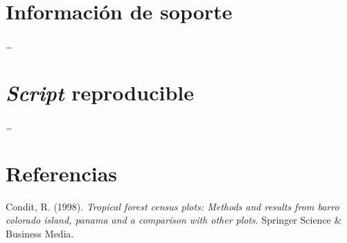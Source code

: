 \documentclass[11pt,]{article}
\begin{document}
\section{Información de soporte}\label{informaciuxf3n-de-soporte}

\ldots

\section{\texorpdfstring{\emph{Script}
reproducible}{Script reproducible}}\label{script-reproducible}

\ldots

\section*{Referencias}\label{referencias}

\hypertarget{refs}{}
\hypertarget{ref-condit1998tropical}{}
Condit, R. (1998). \emph{Tropical forest census plots: Methods and
results from barro colorado island, panama and a comparison with other
plots}. Springer Science \& Business Media.




\newpage
\singlespacing 
\end{document}
